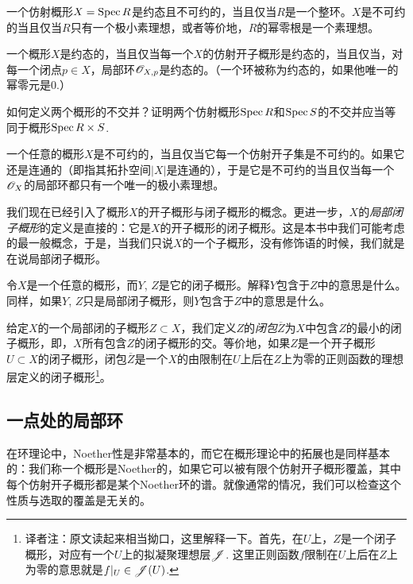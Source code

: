 \begin{exe}
	一个仿射概形$X=\operatorname{Spec} R$是约态且不可约的，当且仅当$R$是一个整环。$X$是不可约的当且仅当$R$只有一个极小素理想，或者等价地，$R$的幂零根是一个素理想。
\end{exe}

\begin{exe}
	一个概形$X$是约态的，当且仅当每一个$X$的仿射开子概形是约态的，当且仅当，对每一个闭点$p\in X$，局部环$\mathscr{O}_{X,p}$是约态的。（一个环被称为约态的，如果他唯一的幂零元是$0$.）
\end{exe}

\begin{exe}
	如何定义两个概形的不交并？证明两个仿射概形$\operatorname{Spec} R$和$\operatorname{Spec} S$的不交并应当等同于概形$\operatorname{Spec} R\times S$.
\end{exe}

\begin{exe}
	一个任意的概形$X$是不可约的，当且仅当它每一个仿射开子集是不可约的。如果它还是连通的（即指其拓扑空间$|X|$是连通的），于是它是不可约的当且仅当每一个$\mathscr{O}_X$的局部环都只有一个唯一的极小素理想。
\end{exe}

我们现在已经引入了概形$X$的开子概形与闭子概形的概念。更进一步，$X$的\textit{局部闭子概形}的定义是直接的：它是$X$的开子概形的闭子概形。这是本书中我们可能考虑的最一般概念，于是，当我们只说$X$的一个子概形，没有修饰语的时候，我们就是在说局部闭子概形。

\begin{exe}
令$X$是一个任意的概形，而$Y$, $Z$是它的闭子概形。解释$Y$包含于$Z$中的意思是什么。同样，如果$Y$, $Z$只是局部闭子概形，则$Y$包含于$Z$中的意思是什么。
\end{exe}

给定$X$的一个局部闭的子概形$Z\subset X$，我们定义$Z$的\textit{闭包}$\overline{Z}$为$X$中包含$Z$的最小的闭子概形，即，$X$所有包含$Z$的闭子概形的交。等价地，如果$Z$是一个开子概形$U\subset X$的闭子概形，闭包$\overline{Z}$是一个$X$的由限制在$U$上后在$Z$上为零的正则函数的理想层定义的闭子概形\footnote{译者注：原文读起来相当拗口，这里解释一下。首先，在$U$上，$Z$是一个闭子概形，对应有一个$U$上的拟凝聚理想层$\mathscr{J}$. 这里正则函数$f$限制在$U$上后在$Z$上为零的意思就是$f|_U\in \mathscr{J}(U)$.}。

\subsection{一点处的局部环} \label{s:1.2.2}

在环理论中，Noether性是非常基本的，而它在概形理论中的拓展也是同样基本的：我们称一个概形是Noether的，如果它可以被有限个仿射开子概形覆盖，其中每个仿射开子概形都是某个Noether环的谱。就像通常的情况，我们可以检查这个性质与选取的覆盖是无关的。

